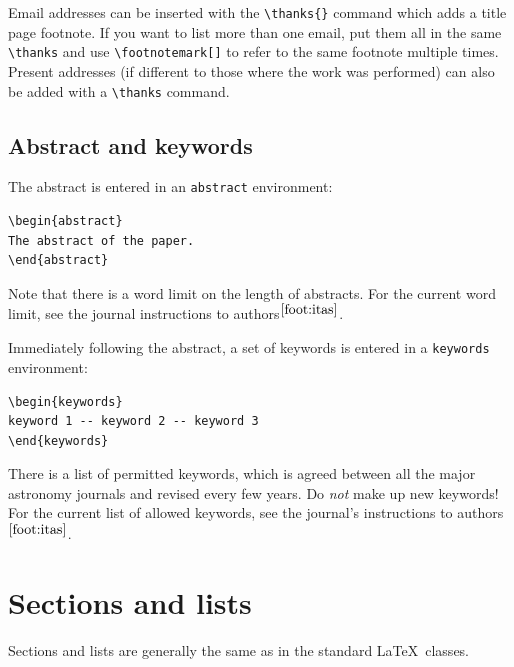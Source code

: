 \documentclass[a4paper,fleqn,usenatbib,useAMS]{mnras}
\begin{document}
Email addresses can be inserted with the \verb'\thanks{}' command which adds a title page footnote.
If you want to list more than one email, put them all in the same \verb'\thanks' and use \verb'\footnotemark[]' to refer to the same footnote multiple times.
Present addresses (if different to those where the work was performed) can also be added with a \verb'\thanks' command.

\subsection{Abstract and keywords}

The abstract is entered in an \verb'abstract' environment:
\begin{verbatim}
\begin{abstract}
The abstract of the paper.
\end{abstract}
\end{verbatim}
\noindent Note that there is a word limit on the length of abstracts.
For the current word limit, see the journal instructions to authors$^{\ref{foot:itas}}$.

Immediately following the abstract, a set of keywords is entered in a \verb'keywords' environment:
\begin{verbatim}
\begin{keywords}
keyword 1 -- keyword 2 -- keyword 3
\end{keywords}
\end{verbatim}
\noindent There is a list of permitted keywords, which is agreed between all the major astronomy journals and revised every few years.
Do \emph{not} make up new keywords!
For the current list of allowed keywords, see the journal's instructions to authors$^{\ref{foot:itas}}$.

\section{Sections and lists}

Sections and lists are generally the same as in the standard \LaTeX\ classes.
\end{document}
